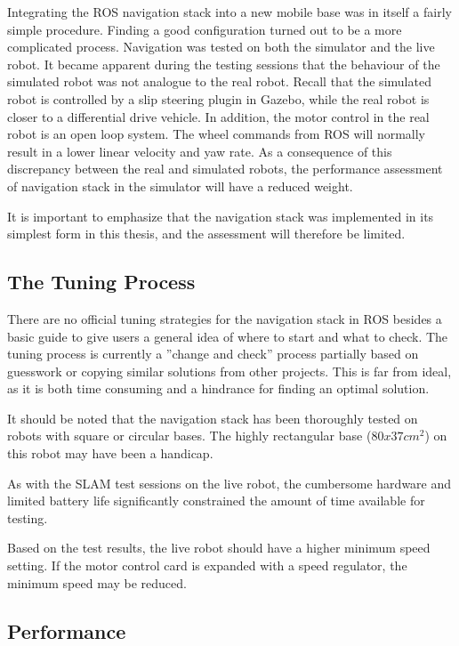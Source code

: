 Integrating the \ac{ROS} navigation stack into a new mobile base was in itself a fairly simple procedure. Finding a good configuration turned out to be a more complicated process. Navigation was tested on both the simulator and the live robot. It became apparent during the testing sessions that the behaviour of the simulated robot was not analogue to the real robot. Recall that the simulated robot is controlled by a slip steering plugin in Gazebo, while the real robot is closer to a differential drive vehicle. In addition, the motor control in the real robot is an open loop system. The wheel commands from \ac{ROS} will normally result in a lower linear velocity and yaw rate. As a consequence of this discrepancy between the real and simulated robots, the performance assessment of navigation stack in the simulator will have a reduced weight.

It is important to emphasize that the navigation stack was implemented in its simplest form in this thesis, and the assessment will therefore be limited. 

\subsection{The Tuning Process}

There are no official tuning strategies for the navigation stack in \ac{ROS} besides a basic guide to give users a general idea of where to start and what to check\cite{ROS_navigation_tuning}. The tuning process is currently a ''change and check'' process partially based on guesswork or copying similar solutions from other projects. This is far from ideal, as it is both time consuming and a hindrance for finding an optimal solution. 

It should be noted that the navigation stack has been thoroughly tested on robots with square or circular bases. The highly rectangular base ($80x37 cm^2$) on this robot may have been a handicap.

As with the \ac{SLAM} test sessions on the live robot, the cumbersome hardware and limited battery life significantly constrained the amount of time available for testing. 

Based on the test results, the live robot should have a higher minimum speed setting. If the motor control card is expanded with a speed regulator, the minimum speed may be reduced.

\subsection{Performance}

